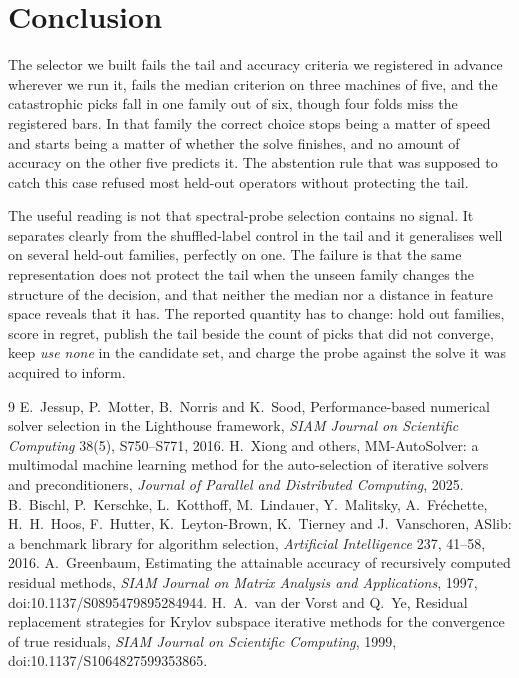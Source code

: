 \documentclass[11pt]{article}
\begin{document}
\section{Conclusion}

The selector we built fails the tail and accuracy criteria we registered in advance
wherever we run it, fails the median criterion on three machines of five, and the
catastrophic picks fall in one family out of six, though four folds miss the registered
bars. In that family the correct
choice stops being a matter of speed and starts being a matter of whether the
solve finishes, and no amount of accuracy on the other five predicts it. The
abstention rule that was supposed to catch this case refused most held-out
operators without protecting the tail.

The useful reading is not that spectral-probe selection contains no signal. It
separates clearly from the shuffled-label control in the tail and it generalises
well on several held-out families, perfectly on one. The failure is that the same
representation does not protect the tail when the unseen family changes the
structure of the decision, and that neither the median nor a distance in feature
space reveals that it has. The reported quantity has to change: hold out
families, score in regret, publish the tail beside the count of picks that did
not converge, keep \emph{use none} in the candidate set, and charge the probe
against the solve it was acquired to inform.

\begin{thebibliography}{9}
 E.~Jessup, P.~Motter, B.~Norris and K.~Sood,
Performance-based numerical solver selection in the Lighthouse framework,
\emph{SIAM Journal on Scientific Computing} 38(5), S750--S771, 2016.
 H.~Xiong and others,
MM-AutoSolver: a multimodal machine learning method for the auto-selection of
iterative solvers and preconditioners,
\emph{Journal of Parallel and Distributed Computing}, 2025.
 B.~Bischl, P.~Kerschke, L.~Kotthoff, M.~Lindauer, Y.~Malitsky,
A.~Fr\'echette, H.~H.~Hoos, F.~Hutter, K.~Leyton-Brown, K.~Tierney and J.~Vanschoren,
ASlib: a benchmark library for algorithm selection,
\emph{Artificial Intelligence} 237, 41--58, 2016.
 A.~Greenbaum,
Estimating the attainable accuracy of recursively computed residual methods,
\emph{SIAM Journal on Matrix Analysis and Applications}, 1997,
doi:10.1137/S0895479895284944.
 H.~A.~van der Vorst and Q.~Ye,
Residual replacement strategies for Krylov subspace iterative methods for the convergence
of true residuals, \emph{SIAM Journal on Scientific Computing}, 1999,
doi:10.1137/S1064827599353865.
\end{thebibliography}
\end{document}
